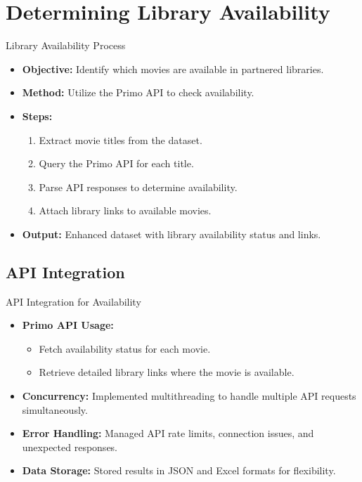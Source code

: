 \documentclass{beamer}
\begin{document}
\section{Determining Library Availability}
\begin{frame}{Library Availability Process}
  \begin{itemize}
    \item \textbf{Objective:} Identify which movies are available in partnered libraries.
    \item \textbf{Method:} Utilize the Primo API to check availability.
    \item \textbf{Steps:}
      \begin{enumerate}
        \item Extract movie titles from the dataset.
        \item Query the Primo API for each title.
        \item Parse API responses to determine availability.
        \item Attach library links to available movies.
      \end{enumerate}
    \item \textbf{Output:} Enhanced dataset with library availability status and links.
  \end{itemize}
\end{frame}

\subsection{API Integration}
\begin{frame}{API Integration for Availability}
  \begin{itemize}
    \item \textbf{Primo API Usage:}
      \begin{itemize}
        \item Fetch availability status for each movie.
        \item Retrieve detailed library links where the movie is available.
      \end{itemize}
    \item \textbf{Concurrency:} Implemented multithreading to handle multiple API requests simultaneously.
    \item \textbf{Error Handling:} Managed API rate limits, connection issues, and unexpected responses.
    \item \textbf{Data Storage:} Stored results in JSON and Excel formats for flexibility.
  \end{itemize}
\end{frame}
\end{document}
